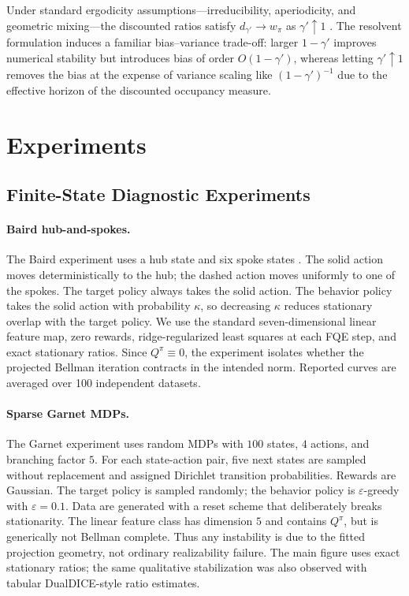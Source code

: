 \documentclass{article}
\theoremstyle{plain}
\theoremstyle{definition}
\theoremstyle{remark}
\begin{document}
Under standard ergodicity assumptions---irreducibility, aperiodicity, and geometric
mixing---the discounted ratios satisfy \(d_{\gamma'} \to w_{\pi}\) as \(\gamma' \uparrow 1\)
\citep{meyn1993markov, glynn1996liapounov}. The resolvent formulation induces a
familiar bias--variance trade-off: larger \(1-\gamma'\) improves numerical
stability but introduces bias of order $O(1-\gamma')$, whereas letting
$\gamma' \uparrow 1$ removes the bias at the expense of variance scaling like
$(1-\gamma')^{-1}$ due to the effective horizon of the discounted occupancy
measure.




 

 

\section{Experiments}
\label{sec::appendix}

\subsection{Finite-State Diagnostic Experiments}
\label{app:toy_norm_mismatch}

\paragraph{Baird hub-and-spokes.}
The Baird experiment uses a hub state and six spoke states
\citep{baird1995residual}. The solid action moves deterministically to the hub;
the dashed action moves uniformly to one of the spokes. The target policy always
takes the solid action. The behavior policy takes the solid action with
probability \(\kappa\), so decreasing \(\kappa\) reduces stationary overlap with
the target policy. We use the standard seven-dimensional linear feature map,
zero rewards, ridge-regularized least squares at each FQE step, and exact
stationary ratios. Since \(Q^\pi\equiv0\), the experiment isolates whether the
projected Bellman iteration contracts in the intended norm. Reported curves are
averaged over 100 independent datasets.

\paragraph{Sparse Garnet MDPs.}
The Garnet experiment uses random MDPs with \(100\) states, \(4\) actions, and
branching factor \(5\). For each state-action pair, five next states are sampled
without replacement and assigned Dirichlet transition probabilities. Rewards
are Gaussian. The target policy is sampled randomly; the behavior policy is
\(\varepsilon\)-greedy with \(\varepsilon=0.1\). Data are generated with a reset
scheme that deliberately breaks stationarity. The linear feature class has
dimension \(5\) and contains \(Q^\pi\), but is generically not Bellman complete.
Thus any instability is due to the fitted projection geometry, not ordinary
realizability failure. The main figure uses exact stationary ratios; the same
qualitative stabilization was also observed with tabular DualDICE-style ratio
estimates.
\end{document}
